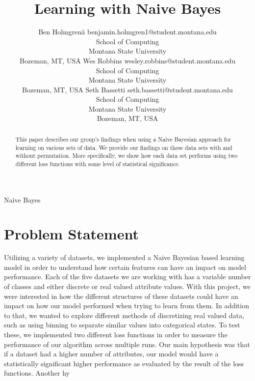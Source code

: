 \documentclass[twoside,11pt]{article}
\begin{document}
\title{Learning with Naive Bayes}

\author{\name Ben Holmgren\u{a} \email benjamin.holmgren1@student.montana.edu \\
       \addr School of Computing\\
       Montana State University\\
       Bozeman, MT, USA
       \AND
       \name Wes Robbins \email wesley.robbins@student.montana.edu \\
       \addr School of Computing\\
       Montana State University\\
       Bozeman, MT, USA
       \AND
       \name Seth Bassetti \email seth.bassetti@student.montana.edu \\
       \addr School of Computing\\
       Montana State University\\
       Bozeman, MT, USA}

\maketitle

\begin{abstract}%
This paper describes our group's findings when using a Naive Bayesian
approach for learning on various sets of data. We provide our findings on
these data sets with and without permutation. More specifically, we show
how each data set performs using two different loss functions with some
level of statistical significance. 
\end{abstract}


\begin{keywords}
  Naive Bayes
\end{keywords}

\section{Problem Statement}
Utilizing a variety of datasets, we implemented a Naive Bayesian based learning model in order to understand how certain features can have an impact on model performance. Each of the five datasets we are working with has a variable number of classes and either discrete or real valued attribute values. With this project, we were interested in how the different structures of these datasets could have an impact on how our model performed when trying to learn from them. In addition to that, we wanted to explore different methods of discretizing real valued data, such as using binning to separate similar values into categorical states. To test these, we implemented two different loss functions in order to measure the performance of our algorithm across multiple runs. Our main hypothesis was that if a dataset had a higher number of attributes, our model would have a statistically significant higher performance as evaluated by the result of the loss functions. Another hy
\end{document}
